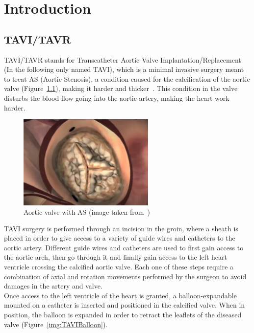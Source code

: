 
\chapter{Introduction}\label{sec:introduction}

\section{TAVI/TAVR}\label{sec:tavi}

TAVI/TAVR stands for Transcatheter Aortic Valve Implantation/Replacement (In the following only named TAVI), which is a minimal invasive surgery meant to treat AS (Aortic Stenosis), a condition caused for the calcification of the aortic valve (Figure~\ref{img:TAVICalValve}), making it harder and thicker~\cite{tavi2013}. This condition in the valve disturbs the blood flow going into the aortic artery, making the heart work harder.\\

\begin{figure}[ht]
   \centering
   \includegraphics[width=0.6\textwidth]{img/TAVICalValve.PNG}
   \caption{Aortic valve with AS (image taken from~\protect\cite{tavivideo})}
   \label{img:TAVICalValve}
\end{figure}

TAVI surgery is performed through an incision in the groin, where a sheath is placed in order to give access to a variety of guide wires and catheters to the aortic artery. Different guide wires and catheters are used to first gain access to the aortic arch, then go through it and finally gain access to the left heart ventricle crossing the calcified aortic valve. Each one of these steps require a combination of axial and rotation movements performed by the surgeon to avoid damages in the artery and valve.\\

Once access to the left ventricle of the heart is granted, a balloon-expandable mounted on a catheter is inserted and positioned in the calcified valve. When in position, the balloon is expanded in order to retract the leaflets of the diseased valve (Figure~\ref{img:TAVIBalloon}).\\

